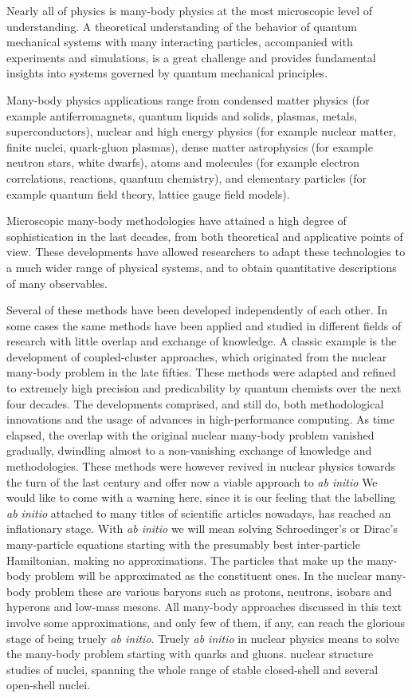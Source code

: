 \documentclass[graybox,sectrefs,envcountresetchap,open=right]{svmonodo}
\begin{document}
Nearly all of physics is many-body physics at the most  
microscopic level of understanding.
A theoretical understanding of the behavior of quantum mechanical systems with many interacting particles,
accompanied with experiments and simulations,   
is a  great challenge and provides fundamental insights into systems governed by quantum mechanical principles.

Many-body physics  applications range from condensed matter physics
(for example antiferromagnets, quantum liquids and solids, plasmas, metals,
superconductors), nuclear and high energy physics (for example nuclear matter, finite
nuclei, quark-gluon plasmas), dense matter astrophysics (for example  neutron
stars, white dwarfs), atoms and molecules (for example electron correlations,
reactions, quantum chemistry), and elementary particles
(for example quantum field theory, lattice gauge field models). 

Microscopic many-body methodologies have attained a high degree of
sophistication in the last decades, from both theoretical and
applicative  points of view. These developments have allowed
researchers to adapt these technologies to a much wider range of physical
systems, and to obtain quantitative descriptions of many 
observables. 

Several of these methods have been developed independently of each other.
In some  cases the same methods have been applied and studied in different
fields of research with little overlap and exchange of knowledge. 
A classic example is the development of coupled-cluster approaches,
which originated from the nuclear many-body problem in the late fifties.
These methods were adapted and refined 
to extremely high precision and predicability by quantum chemists over 
the next four decades. The developments comprised, and still do,  
both methodological innovations and the usage of advances in high-performance computing.    
As time elapsed,   
the overlap with the original nuclear many-body problem vanished gradually, 
dwindling almost to a non-vanishing exchange of knowledge and methodologies. 
These methods were however revived in nuclear physics towards the turn of the last century and offer now a viable approach
to \emph{ab initio} We would like to come with a warning here, since it is our feeling that the 
labelling \emph{ab initio} attached to many titles of scientific articles nowadays, has reached an inflationary stage. 
With \emph{ab initio} we will mean solving Schroedinger's or Dirac's many-particle equations starting with the presumably best 
inter-particle Hamiltonian, making no approximations. The particles that make up the many-body problem will be approximated 
as the constituent ones. 
In the nuclear many-body problem
these are various baryons such as protons, neutrons, isobars and hyperons and low-mass mesons. All many-body approaches discussed in this text involve
some approximations, and only few of them, if any,  can reach the glorious stage of being truely \emph{ab initio}.
Truely \emph{ab initio} in nuclear physics means to solve the many-body problem starting with quarks and gluons.
nuclear structure  studies of nuclei,   spanning the whole range of stable closed-shell and several open-shell nuclei. 
\end{document}
